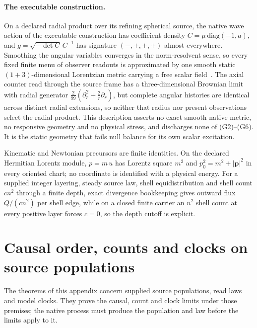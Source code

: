 \documentclass[11pt]{article}
\begin{document}
\paragraph{The executable construction.}
On a declared radial product over its refining spherical source, the native
wave action of the executable construction has coefficient density
$C=\mu\,\mathrm{diag}(-1,a)$, and $g=\sqrt{-\det C}\,C^{-1}$ has signature
$(-,+,+,+)$ almost everywhere. Smoothing the angular variables converges in
the norm-resolvent sense, so every fixed finite menu of observer readouts is
approximated by one smooth static $(1+3)$-dimensional Lorentzian metric
carrying a free scalar field~\cite{ophmodel}. The axial counter read through
the source frame has a three-dimensional Brownian limit with radial generator
$\tfrac{2}{99}(\partial_r^2+\tfrac2r\partial_r)$, but complete angular
histories are identical across distinct radial extensions, so neither that
radius nor present observations select the radial product. This description
asserts no exact smooth native metric, no responsive geometry and no physical
stress, and discharges none of (G2)--(G6). It is the static geometry that fails
null balance for its own scalar excitation.

Kinematic and Newtonian precursors are finite identities. On the declared
Hermitian Lorentz module, $p=m\,u$ has Lorentz square $m^2$ and
$p_0^2=m^2+|\mathbf p|^2$ in every oriented chart; no coordinate is identified
with a physical energy. For a supplied integer layering, steady source law,
shell equidistribution and shell count $c n^2$ through a finite depth, exact
divergence bookkeeping gives outward flux $Q/(c n^2)$ per shell edge, while on
a closed finite carrier an $n^2$ shell count at every positive layer forces
$c=0$, so the depth cutoff is explicit.

\tableofcontents
\clearpage

\def\OPHSkipStandardModelChain{1}
\def\OPHEinsteinDerivationPaper{1}
\def\OPHSkipEmbeddedReferences{1}



\appendix


\section{Causal order, counts and clocks on source populations}
\label{app:source-causal-order}

The theorems of this appendix concern supplied source populations, read laws
and model clocks. They prove the causal, count and clock limits under those
premises; the native process must produce the population and law before the
limits apply to it.
\end{document}
